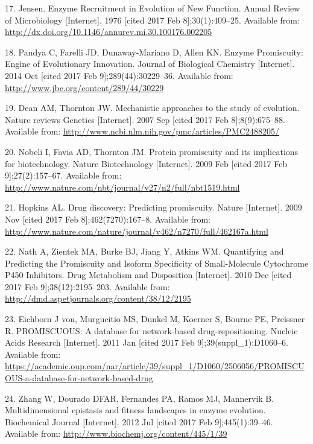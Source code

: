 \documentclass[12pt,twoside]{reedthesis}
\begin{document}
  \hypertarget{ref-jensen_enzyme_1976}{}
  17. Jensen. Enzyme Recruitment in Evolution of New Function. Annual
  Review of Microbiology {[}Internet{]}. 1976 {[}cited 2017 Feb
  8{]};30(1):409--25. Available from:
  \url{http://dx.doi.org/10.1146/annurev.mi.30.100176.002205}
  
  \hypertarget{ref-pandya_enzyme_2014}{}
  18. Pandya C, Farelli JD, Dunaway-Mariano D, Allen KN. Enzyme
  Promiscuity: Engine of Evolutionary Innovation. Journal of Biological
  Chemistry {[}Internet{]}. 2014 Oct {[}cited 2017 Feb
  9{]};289(44):30229--36. Available from:
  \url{http://www.jbc.org/content/289/44/30229}
  
  \hypertarget{ref-dean_mechanistic_2007}{}
  19. Dean AM, Thornton JW. Mechanistic approaches to the study of
  evolution. Nature reviews Genetics {[}Internet{]}. 2007 Sep {[}cited
  2017 Feb 8{]};8(9):675--88. Available from:
  \url{http://www.ncbi.nlm.nih.gov/pmc/articles/PMC2488205/}
  
  \hypertarget{ref-nobeli_protein_2009}{}
  20. Nobeli I, Favia AD, Thornton JM. Protein promiscuity and its
  implications for biotechnology. Nature Biotechnology {[}Internet{]}.
  2009 Feb {[}cited 2017 Feb 9{]};27(2):157--67. Available from:
  \url{http://www.nature.com/nbt/journal/v27/n2/full/nbt1519.html}
  
  \hypertarget{ref-hopkins_drug_2009}{}
  21. Hopkins AL. Drug discovery: Predicting promiscuity. Nature
  {[}Internet{]}. 2009 Nov {[}cited 2017 Feb 8{]};462(7270):167--8.
  Available from:
  \url{http://www.nature.com/nature/journal/v462/n7270/full/462167a.html}
  
  \hypertarget{ref-nath_quantifying_2010}{}
  22. Nath A, Zientek MA, Burke BJ, Jiang Y, Atkins WM. Quantifying and
  Predicting the Promiscuity and Isoform Specificity of Small-Molecule
  Cytochrome P450 Inhibitors. Drug Metabolism and Disposition
  {[}Internet{]}. 2010 Dec {[}cited 2017 Feb 9{]};38(12):2195--203.
  Available from: \url{http://dmd.aspetjournals.org/content/38/12/2195}
  
  \hypertarget{ref-von_eichborn_promiscuous:_2011}{}
  23. Eichborn J von, Murgueitio MS, Dunkel M, Koerner S, Bourne PE,
  Preissner R. PROMISCUOUS: A database for network-based
  drug-repositioning. Nucleic Acids Research {[}Internet{]}. 2011 Jan
  {[}cited 2017 Feb 9{]};39(suppl\_1):D1060--6. Available from:
  \url{https://academic.oup.com/nar/article/39/suppl_1/D1060/2506056/PROMISCUOUS-a-database-for-network-based-drug}
  
  \hypertarget{ref-zhang_multidimensional_2012}{}
  24. Zhang W, Dourado DFAR, Fernandes PA, Ramos MJ, Mannervik B.
  Multidimensional epistasis and fitness landscapes in enzyme evolution.
  Biochemical Journal {[}Internet{]}. 2012 Jul {[}cited 2017 Feb
  9{]};445(1):39--46. Available from:
  \url{http://www.biochemj.org/content/445/1/39}
  
\end{document}
